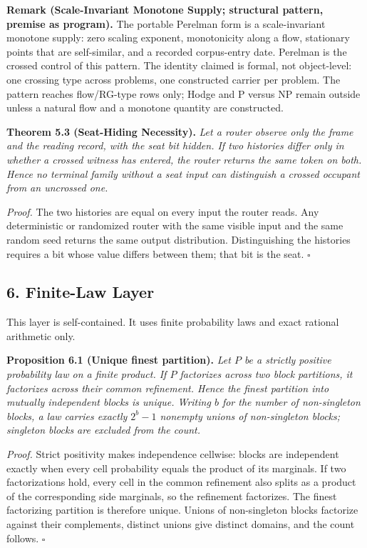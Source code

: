 \documentclass[10pt,twocolumn]{article}
\begin{document}
\textbf{Remark (Scale-Invariant Monotone Supply; structural pattern,
premise as program).} The portable Perelman form is a scale-invariant
monotone supply: zero scaling exponent, monotonicity along a flow,
stationary points that are self-similar, and a recorded corpus-entry
date. Perelman is the crossed control of this pattern. The identity
claimed is formal, not object-level: one crossing type across problems,
one constructed carrier per problem. The pattern reaches flow/RG-type
rows only; Hodge and P versus NP remain outside unless a natural flow
and a monotone quantity are constructed.

\textbf{Theorem 5.3 (Seat-Hiding Necessity).} \emph{Let a router observe
only the frame and the reading record, with the seat bit hidden. If two
histories differ only in whether a crossed witness has entered, the
router returns the same token on both. Hence no terminal family without
a seat input can distinguish a crossed occupant from an uncrossed one.}

\emph{Proof.} The two histories are equal on every input the router
reads. Any deterministic or randomized router with the same visible
input and the same random seed returns the same output distribution.
Distinguishing the histories requires a bit whose value differs between
them; that bit is the seat. \(\square\)

\subsection{6. Finite-Law Layer}\label{finite-law-layer}

This layer is self-contained. It uses finite probability laws and exact
rational arithmetic only.

\textbf{Proposition 6.1 (Unique finest partition).} \emph{Let \(P\) be a
strictly positive probability law on a finite product. If \(P\)
factorizes across two block partitions, it factorizes across their
common refinement. Hence the finest partition into mutually independent
blocks is unique. Writing \(b\) for the number of non-singleton blocks,
a law carries exactly \(2^b - 1\) nonempty unions of non-singleton
blocks; singleton blocks are excluded from the count.}

\emph{Proof.} Strict positivity makes independence cellwise: blocks are
independent exactly when every cell probability equals the product of
its marginals. If two factorizations hold, every cell in the common
refinement also splits as a product of the corresponding side marginals,
so the refinement factorizes. The finest factorizing partition is
therefore unique. Unions of non-singleton blocks factorize against their
complements, distinct unions give distinct domains, and the count
follows. \(\square\)
\end{document}
